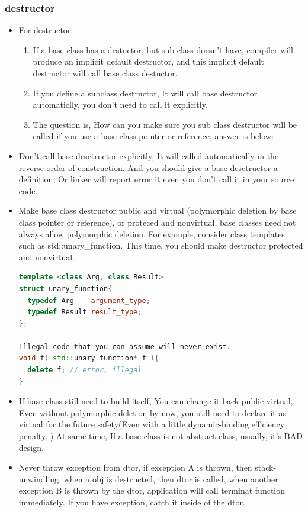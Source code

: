 \documentclass[a4paper,12pt,twoside]{book}
\begin{document}
\subsubsection{destructor}
\begin{itemize}
\item For destructor:
\begin{enumerate}
\item If a base class has a destuctor, but sub class doesn't have,  compiler will produce an implicit default destructor, and this implicit default destructor will call base class destuctor.
\item If you define a subclass destructor, It will call base destructor automaticlly, you don't need to call it explicitly.
\item The question is, How can you make sure you sub class destructor will be called if you use a base class pointer or reference, answer is below:
\end{enumerate}

\item Don't call base desctructor explicitly, It will called automatically in the reverse order of construction.  And you should give a base desctructor a definition, Or linker will report error it even you don't call it in your source code.

\item Make base class destructor public and virtual (polymorphic deletion by base class pointer or reference), or proteced and nonvirtual, base classes need not always allow polymorphic deletion. For example, consider class templates such as std::unary\_function. This time, you should make destructor protected and nonvirtual.
 \begin{lstlisting}[frame=single, language=c++]
template <class Arg, class Result>
struct unary_function{
  typedef Arg    argument_type;
  typedef Result result_type;
};

Illegal code that you can assume will never exist.
void f( std::unary_function* f ){
  delete f; // error, illegal
}
\end{lstlisting}

\item If base class still need to build itself, You can change it back public virtual,  Even without polymorphic deletion by now, you still need to declare it as virtual for the future safety(Even with a little dynamic-binding efficiency penalty. ) At same time, If a base class is not abstract class, usually, it's BAD design.

\item Never throw exception from dtor, if exception A is thrown, then stack-unwindling, when a obj is destructed, then dtor is called, when another exception B is thrown by the dtor, application will call terminat function immediately.  If you have exception, catch it inside of the dtor.

\end{itemize}
\end{document}
